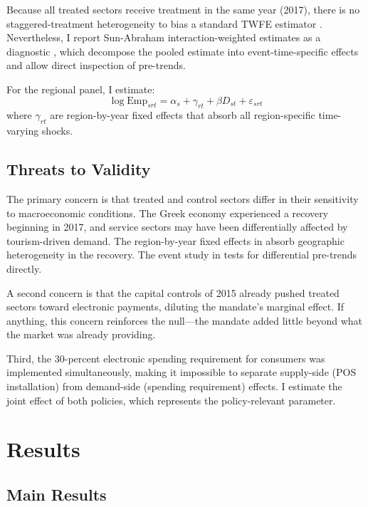 \documentclass[12pt]{article}
\begin{document}
Because all treated sectors receive treatment in the same year (2017), there is no staggered-treatment heterogeneity to bias a standard TWFE estimator \citep{goodman2021difference}. Nevertheless, I report Sun-Abraham interaction-weighted estimates as a diagnostic \citep{sun2021estimating}, which decompose the pooled estimate into event-time-specific effects and allow direct inspection of pre-trends.

For the regional panel, I estimate:
\begin{equation}
\log \text{Emp}_{srt} = \alpha_s + \gamma_{rt} + \beta D_{st} + \varepsilon_{srt}
\label{eq:regional}
\end{equation}
where $\gamma_{rt}$ are region-by-year fixed effects that absorb all region-specific time-varying shocks.

\subsection{Threats to Validity}

The primary concern is that treated and control sectors differ in their sensitivity to macroeconomic conditions. The Greek economy experienced a recovery beginning in 2017, and service sectors may have been differentially affected by tourism-driven demand. The region-by-year fixed effects in  absorb geographic heterogeneity in the recovery. The event study in  tests for differential pre-trends directly.

A second concern is that the capital controls of 2015 already pushed treated sectors toward electronic payments, diluting the mandate's marginal effect. If anything, this concern reinforces the null---the mandate added little beyond what the market was already providing.

Third, the 30-percent electronic spending requirement for consumers was implemented simultaneously, making it impossible to separate supply-side (POS installation) from demand-side (spending requirement) effects. I estimate the joint effect of both policies, which represents the policy-relevant parameter.


\section{Results}

\subsection{Main Results}
\end{document}
